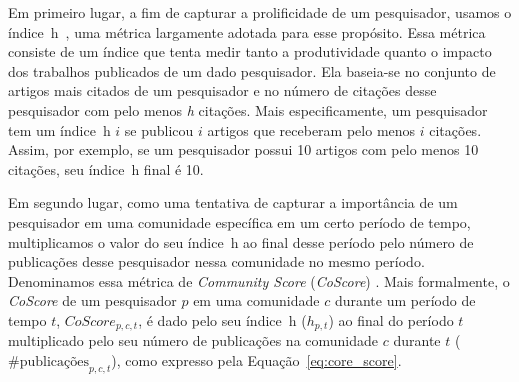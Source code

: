 Em primeiro lugar, a fim de capturar a prolificidade de um pesquisador, usamos o índice~h~\citep{Hirsch2005}, 
uma métrica largamente adotada para esse propósito. Essa métrica consiste de um índice que tenta 
medir tanto a produtividade quanto o impacto dos trabalhos publicados de um dado pesquisador. Ela 
baseia-se no conjunto de artigos mais citados de um pesquisador e no número de citações 
desse pesquisador com pelo menos \textit{h} citações. Mais especificamente, um pesquisador tem um índice~h $i$ se publicou $i$ 
artigos que receberam pelo menos $i$ citações. Assim, por exemplo, se um pesquisador possui 
10 artigos com pelo menos 10 citações, seu índice~h final é 10.



Em segundo lugar, como uma tentativa de capturar a importância de um pesquisador em uma comunidade 
específica em um certo período de tempo, multiplicamos o valor do seu índice~h 
ao final desse período pelo número de publicações desse pesquisador nessa comunidade 
no mesmo período. Denominamos essa métrica de \textit{Community Score} (\textit{CoScore}) \citep{Alves2013}. 
Mais formalmente, o \textit{CoScore} de um pesquisador $p$ em uma 
comunidade $c$ durante um período de tempo $t$, $\textit{CoScore}_{p,c,t}$, é dado 
pelo seu índice~h ($h_{p,t}$) ao final do período $t$ multiplicado pelo 
seu número de publicações na comunidade $c$ durante $t$ ($\textrm{\#}\text{publicações}_{p,c,t}$),
como expresso pela Equação~\ref{eq:core_score}.

